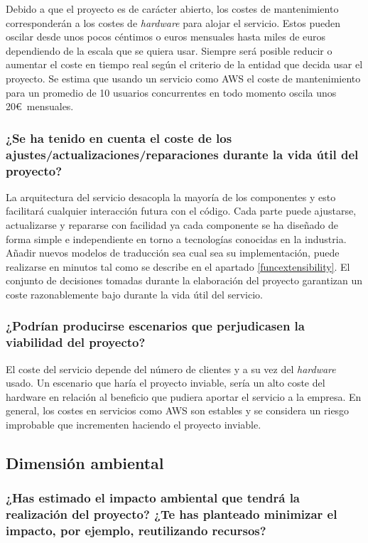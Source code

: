 Debido a que el proyecto es de carácter abierto, los costes de mantenimiento corresponderán a los costes de \textit{hardware} para alojar el servicio. Estos pueden oscilar desde unos pocos céntimos o euros mensuales hasta miles de euros dependiendo de la escala que se quiera usar. Siempre será posible reducir o aumentar el coste en tiempo real según el criterio de la entidad que decida usar el proyecto. Se estima que usando un servicio como AWS el coste de mantenimiento para un promedio de 10 usuarios concurrentes en todo momento oscila unos 20\euro\ mensuales.

\subsubsection{¿Se ha tenido en cuenta el coste de los ajustes/actualizaciones/reparaciones durante la vida útil del proyecto?}
La arquitectura del servicio desacopla la mayoría de los componentes y esto facilitará cualquier interacción futura con el código. Cada parte puede ajustarse, actualizarse y repararse con facilidad ya cada componente se ha diseñado de forma simple e independiente en torno a tecnologías conocidas en la industria. Añadir nuevos modelos de traducción sea cual sea su implementación, puede realizarse en minutos tal como se describe en el apartado \ref{funcextensibility}. El conjunto de decisiones tomadas durante la elaboración del proyecto garantizan un coste razonablemente bajo durante la vida útil del servicio.

\subsubsection{¿Podrían producirse escenarios que perjudicasen la viabilidad del proyecto?}
El coste del servicio depende del número de clientes y a su vez del \textit{hardware} usado. Un escenario que haría el proyecto inviable, sería un alto coste del hardware en relación al beneficio que pudiera aportar el servicio a la empresa.
En general, los costes en servicios como AWS son estables y se considera un riesgo improbable que incrementen haciendo el proyecto inviable.

\subsection{Dimensión ambiental}
\subsubsection{¿Has estimado el impacto ambiental que tendrá la realización del proyecto? ¿Te has
planteado minimizar el impacto, por ejemplo, reutilizando recursos?}\label{susambmedth}

